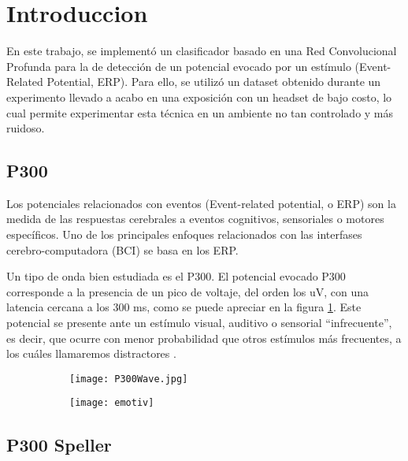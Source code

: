 \section{Introduccion}

En este trabajo, se implementó un clasificador basado en una Red Convolucional Profunda para la de detección de un potencial evocado por un estímulo (Event-Related Potential, ERP). Para ello, se utilizó un dataset obtenido durante un experimento llevado a acabo en una exposición con un headset de bajo costo, lo cual permite experimentar esta técnica en un ambiente no tan controlado y más ruidoso.

\subsection{P300}

Los potenciales relacionados con eventos (Event-related potential, o ERP) son la medida de las respuestas cerebrales a eventos cognitivos, sensoriales o motores específicos. Uno de los principales enfoques relacionados con las interfases cerebro-computadora (BCI) se basa en los ERP.

Un tipo de onda bien estudiada es el P300. El potencial evocado P300 corresponde a la presencia de un pico de voltaje, del orden los uV, con una latencia cercana a los 300 ms, como se puede apreciar en la figura \ref{fig:P300Wave}. Este potencial se presente ante un estímulo visual, auditivo o sensorial ``infrecuente'', es decir, que ocurre con menor probabilidad que otros estímulos más frecuentes, a los cuáles llamaremos distractores \cite{Amiri2013ARO}.

\begin{figure}[t]
    \centering
    \begin{subfigure}{.45\textwidth}
        \texttt{[image: P300Wave.jpg]}
        \label{fig:P300Wave}
    \end{subfigure}
    
    \begin{subfigure}{.45\textwidth}
        \texttt{[image: emotiv]}
        \label{fig:ElectrodeMap}
    \end{subfigure}
    
\end{figure}


\subsection{P300 Speller}

